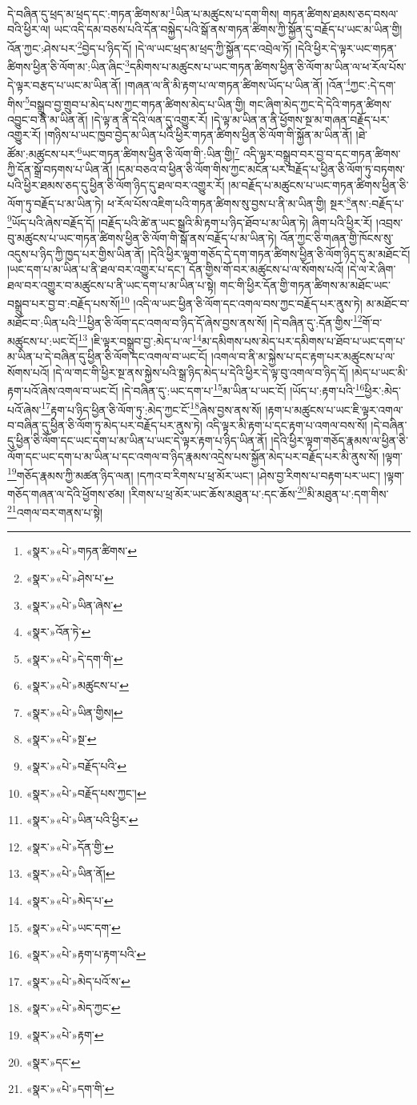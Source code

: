 དེ་བཞིན་དུ་ཕྲད་མ་ཕྲད་དང་:གཏན་ཚིགས་མ་\footnote{«སྣར་»«པེ་»གཏན་ཚིགས་}ཡིན་པ་མཚུངས་པ་དག་གིས། གཏན་ཚིགས་ཐམས་ཅད་བསལ་བའི་ཕྱིར་ལ། ཡང་འདི་དམ་བཅས་པའི་དོན་བསྐྱེད་པའི་སྒོ་ནས་གཏན་ཚིགས་ཀྱི་སྐྱོན་དུ་བརྗོད་པ་ཡང་མ་ཡིན་གྱི། འོན་ཀྱང་:ཤེས་པར་\footnote{«སྣར་»«པེ་»ཤེས་པ་}བྱེད་པ་ཉིད་དོ། །དེ་ལ་ཡང་ཕྲད་མ་ཕྲད་ཀྱི་སྐྱོན་དང་འབྲེལ་ཏོ། །དེའི་ཕྱིར་དེ་ལྟར་ཡང་གཏན་ཚིགས་ཕྱིན་ཅི་ལོག་མ་:ཡིན་ཞིང་\footnote{«སྣར་»«པེ་»ཡིན་ཞེས་}དམིགས་པ་མཚུངས་པ་ཡང་གཏན་ཚིགས་ཕྱིན་ཅི་ལོག་མ་ཡིན་ལ་ཕ་རོལ་པོས་དེ་ལྟར་བརྩད་པ་ཡང་མ་ཡིན་ནོ། །གཞན་ལ་ནི་མི་རྟག་པ་ལ་གཏན་ཚིགས་ཡོད་པ་ཡིན་ནོ། །འོན་\footnote{«སྣར་»འོན་ཏེ་}ཀྱང་:དེ་དག་གིས་\footnote{«སྣར་»«པེ་»དེ་དག་གི་}བསྒྲུབ་བྱ་གྲུབ་པ་མེད་པས་ཀྱང་གཏན་ཚིགས་མེད་པ་ཡིན་གྱི། གང་ཞིག་མེད་ཀྱང་དེ་དེའི་གཏན་ཚིགས་འབྱུང་བ་ནི་མ་ཡིན་ནོ། །དེ་ལྟ་ན་ནི་དེའི་ལན་དུ་འགྱུར་རོ། །དེ་ལྟ་མ་ཡིན་ན་ནི་ཕྱོགས་སྔ་མ་གཞན་བརྗོད་པར་འགྱུར་རོ། །གཉིས་པ་ཡང་ཁྱབ་བྱེད་མ་ཡིན་པའི་ཕྱིར་གཏན་ཚིགས་ཕྱིན་ཅི་ལོག་གི་སྐྱོན་མ་ཡིན་ནོ། །ཐེ་ཚོམ་:མཚུངས་པར་\footnote{«སྣར་»«པེ་»མཚུངས་པ་}ཡང་གཏན་ཚིགས་ཕྱིན་ཅི་ལོག་གི་:ཡིན་གྱི།\footnote{«སྣར་»«པེ་»ཡིན་གྱིས།} འདི་ལྟར་བསྒྲུབ་བར་བྱ་བ་དང་གཏན་ཚིགས་ཀྱི་དོན་སྒྲོ་བཏགས་པ་ཡིན་ནོ། །དམ་བཅའ་བ་ཕྱིན་ཅི་ལོག་གིས་ཀྱང་མངོན་པར་བརྗོད་པ་ཕྱིན་ཅི་ལོག་ཏུ་བཏགས་པའི་ཕྱིར་ཐམས་ཅད་དུ་ཕྱིན་ཅི་ལོག་ཉིད་དུ་ཐལ་བར་འགྱུར་རོ། །མ་བརྗོད་པ་མཚུངས་པ་ཡང་གཏན་ཚིགས་ཕྱིན་ཅི་ལོག་ཏུ་བརྗོད་པ་མ་ཡིན་ཏེ། ཕ་རོལ་པོས་འཇིག་པའི་གཏན་ཚིགས་སུ་བྱས་པ་ནི་མ་ཡིན་གྱི། སྔར་\footnote{«སྣར་»«པེ་»སྔ་}ནས་:བརྗོད་པ་\footnote{«སྣར་»«པེ་»བརྗོད་པའི་}ཡོད་པའི་ཞེས་བརྗོད་དོ། །བརྗོད་པའི་ཚེ་ན་ཡང་སྒྲའི་མི་རྟག་པ་ཉིད་ཐོབ་པ་མ་ཡིན་ཏེ། ཞིག་པའི་ཕྱིར་རོ། །འབྲས་བུ་མཚུངས་པ་ཡང་གཏན་ཚིགས་ཕྱིན་ཅི་ལོག་གི་སྒོ་ནས་བརྗོད་པ་མ་ཡིན་ཏེ། འོན་ཀྱང་ཅི་གཞན་གྱི་ཁོངས་སུ་འདུས་པ་ཉིད་ཀྱི་ཁྱད་པར་གྱིས་ཡིན་ནོ། །དེའི་ཕྱིར་ལྟག་གཅོད་དེ་དག་གཏན་ཚིགས་ཕྱིན་ཅི་ལོག་ཉིད་དུ་མ་མཐོང་ངོ། །ཡང་དག་པ་མ་ཡིན་པ་ནི་ཐལ་བར་འགྱུར་པ་དང་། དོན་གྱིས་གོ་བར་མཚུངས་པ་ལ་སོགས་པའོ། །དེ་ལ་རེ་ཞིག་ཐལ་བར་འགྱུར་བ་མཚུངས་པ་ནི་ཡང་དག་པ་མ་ཡིན་པ་སྟེ། གང་གི་ཕྱིར་དོན་གྱི་གཏན་ཚིགས་མ་མཐོང་ཡང་བསྒྲུབ་པར་བྱ་བ་:བརྗོད་པས་སོ།\footnote{«སྣར་»«པེ་»བརྗོད་པས་ཀྱང་།} །འདི་ལ་ཡང་ཕྱིན་ཅི་ལོག་དང་འགལ་བས་ཀྱང་བརྗོད་པར་ནུས་ཏེ། མ་མཐོང་བ་མཐོང་བ་:ཡིན་པའི་\footnote{«སྣར་»«པེ་»ཡིན་པའི་ཕྱིར་}ཕྱིན་ཅི་ལོག་དང་འགལ་བ་ཉིད་དོ་ཞེས་བྱས་ནས་སོ། །དེ་བཞིན་དུ་:དོན་གྱིས་\footnote{«སྣར་»«པེ་»དོན་གྱི་}གོ་བ་མཚུངས་པ་:ཡང་ངོ།\footnote{«སྣར་»«པེ་»ཡིན་ནོ།} །ཇི་ལྟར་བསྒྲུབ་བྱ་:མེད་པ་ལ་\footnote{«སྣར་»«པེ་»མེད་པ་}མ་དམིགས་པས་མེད་པར་དམིགས་པ་ཐོབ་པ་ཡང་དག་པ་མ་ཡིན་པ་དེ་བཞིན་དུ་ཕྱིན་ཅི་ལོག་དང་འགལ་བ་ཡང་ངོ། །འགལ་བ་ནི་མ་སྐྱེས་པ་དང་རྟག་པར་མཚུངས་པ་ལ་སོགས་པའོ། །དེ་ལ་གང་གི་ཕྱིར་སྔ་ནས་སྐྱེས་པའི་སྒྲ་ཉིད་མེད་པ་དེའི་ཕྱིར་དེ་ལྟ་བུ་འགལ་བ་ཉིད་དོ། །མེད་པ་ཡང་མི་རྟག་པའོ་ཞེས་འགལ་བ་ཡང་ངོ། །དེ་བཞིན་དུ་:ཡང་དག་པ་\footnote{«སྣར་»«པེ་»ཡང་དག་}མ་ཡིན་པ་ཡང་ངོ། །ཡོད་པ་:རྟག་པའི་\footnote{«སྣར་»«པེ་»རྟག་པ་རྟག་པའི་}ཕྱིར་:མེད་པའོ་ཞེས་\footnote{«སྣར་»«པེ་»མེད་པའོ་ས་}རྟག་པ་ཉིད་ཕྱིན་ཅི་ལོག་ཏུ་:མེད་ཀྱང་ངོ་\footnote{«སྣར་»«པེ་»མེད་ཀྱང་}ཞེས་བྱས་ནས་སོ། །རྟག་པ་མཚུངས་པ་ཡང་ཇི་ལྟར་འགལ་བ་བཞིན་དུ་ཕྱིན་ཅི་ལོག་ཏུ་མེད་པར་བརྗོད་པར་ནུས་ཏེ། འདི་ལྟར་མི་རྟག་པ་དང་རྟག་པ་འགལ་བས་སོ། །དེ་བཞིན་དུ་ཕྱིན་ཅི་ལོག་དང་ཡང་དག་པ་མ་ཡིན་པ་ཡང་དེ་ལྟར་རྟག་པ་ཉིད་ཡིན་ནོ། །དེའི་ཕྱིར་ལྟག་གཅོད་རྣམས་ལ་ཕྱིན་ཅི་ལོག་དང་ཡང་དག་པ་མ་ཡིན་པ་དང་འགལ་བ་ཉིད་རྣམས་འདྲེས་པས་སྐྱོན་མེད་པར་བརྗོད་པར་མི་ནུས་སོ། །ལྟག་\footnote{«སྣར་»«པེ་»རྟག་}གཅོད་རྣམས་ཀྱི་མཚན་ཉིད་ལན། །དཀའ་བ་རིགས་པ་ཕྲ་མོར་ཡང་། །ཤེས་བྱ་རིགས་པ་བརྟག་པར་ཡང་། །ལྟག་གཅོད་གཞན་ལ་དེའི་ཕྱོགས་ཙམ། །རིགས་པ་ཕྲ་མོར་ཡང་ཆོས་མཐུན་པ་:དང་ཆོས་\footnote{«སྣར་»དང་}མི་མཐུན་པ་:དག་གིས་\footnote{«སྣར་»«པེ་»དག་གི་}འགལ་བར་གནས་པ་སྟེ། 